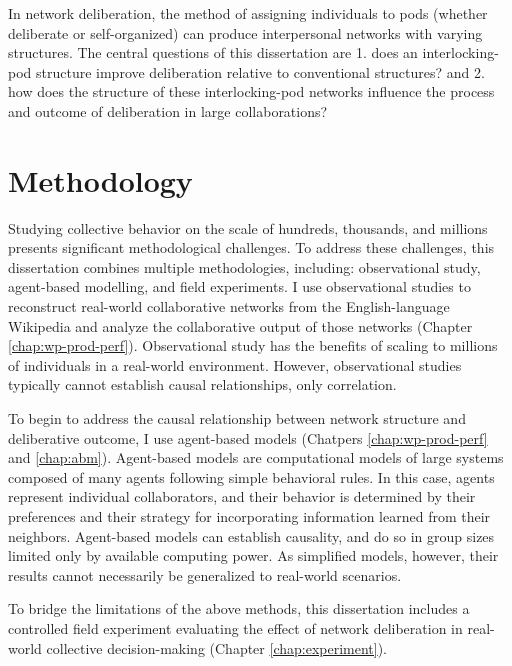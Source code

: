 In network deliberation, the method of assigning individuals to pods
(whether deliberate or self-organized) can produce interpersonal networks with
varying structures.
The central questions of this dissertation are 1. does an interlocking-pod structure improve deliberation relative to conventional structures? and 2. how does the structure of these interlocking-pod networks influence the process and outcome of deliberation
in large collaborations?

\section{Methodology}

Studying collective behavior on the scale of hundreds, thousands, and millions
presents significant methodological challenges.
To address these challenges, this dissertation combines multiple methodologies,
including: observational study, agent-based modelling, and field experiments.
I use observational studies to reconstruct real-world collaborative networks
from the English-language Wikipedia and analyze the collaborative output of
those networks (Chapter \ref{chap:wp-prod-perf}).
Observational study has the benefits of scaling to millions of individuals
in a real-world environment.
However, observational studies typically cannot establish causal relationships,
only correlation.

To begin to address the causal relationship between network structure and
deliberative outcome, I use agent-based models
(Chatpers \ref{chap:wp-prod-perf} and \ref{chap:abm}).
Agent-based models are computational models of large systems composed of
many agents following simple behavioral rules.
In this case, agents represent individual collaborators,
and their behavior is determined by their preferences and their strategy for
incorporating information learned from their neighbors.
Agent-based models can establish causality,
and do so in group sizes limited only by available computing power.
As simplified models, however, their results cannot necessarily be generalized
to real-world scenarios.

To bridge the limitations of the above methods,
this dissertation includes a controlled field experiment evaluating the
effect of network deliberation in real-world collective decision-making
(Chapter \ref{chap:experiment}).

